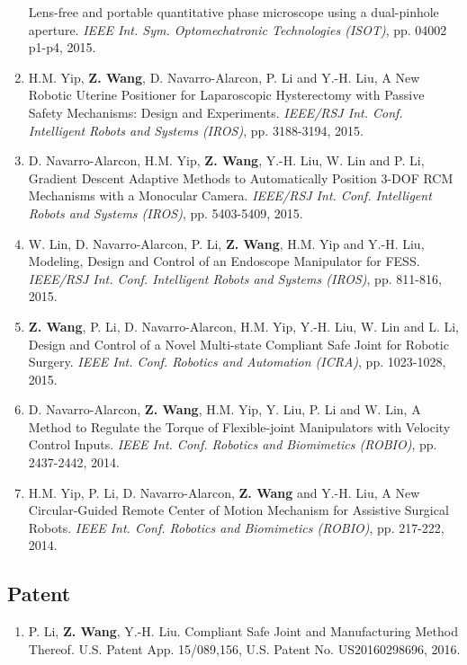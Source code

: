 \documentclass[10pt,letterpaper]{article}
\begin{document}
\begin{enumerate}
    Lens-free and portable quantitative phase microscope using a dual-pinhole aperture.
    \textit{{IEEE} Int. Sym. Optomechatronic Technologies (ISOT)}, pp. 04002 p1-p4, 2015.
    \item H.M. Yip, \textbf{Z. Wang}, D. Navarro-Alarcon, P. Li and Y.-H. Liu,
    A New Robotic Uterine Positioner for Laparoscopic Hysterectomy with Passive Safety Mechanisms: Design and Experiments.
    \textit{{IEEE/RSJ} Int. Conf. Intelligent Robots and Systems (IROS)}, pp. 3188-3194, 2015.
    \item D. Navarro-Alarcon, H.M. Yip, \textbf{Z. Wang}, Y.-H. Liu, W. Lin and P. Li,
    Gradient Descent Adaptive Methods to Automatically Position 3-DOF RCM Mechanisms with a Monocular Camera.
    \textit{{IEEE/RSJ} Int. Conf. Intelligent Robots and Systems (IROS)}, pp. 5403-5409, 2015.
    \item W. Lin, D. Navarro-Alarcon, P. Li, \textbf{Z. Wang}, H.M. Yip and Y.-H. Liu,
    Modeling, Design and Control of an Endoscope Manipulator for FESS.
    \textit{{IEEE/RSJ} Int. Conf. Intelligent Robots and Systems (IROS)}, pp. 811-816, 2015.
    \item \textbf{Z. Wang}, P. Li, D. Navarro-Alarcon, H.M. Yip, Y.-H. Liu, W. Lin and L. Li,
    Design and Control of a Novel Multi-state Compliant Safe Joint for Robotic Surgery.
    \textit{{IEEE} Int. Conf. Robotics and Automation (ICRA)}, pp. 1023-1028, 2015.
    \item D. Navarro-Alarcon, \textbf{Z. Wang}, H.M. Yip, Y. Liu, P. Li and W. Lin,
    A Method to Regulate the Torque of Flexible-joint Manipulators with Velocity Control Inputs.
    \textit{{IEEE} Int. Conf. Robotics and Biomimetics (ROBIO)}, pp. 2437-2442, 2014.
    \item H.M. Yip, P. Li, D. Navarro-Alarcon, \textbf{Z. Wang} and Y.-H. Liu,
    A New Circular-Guided Remote Center of Motion Mechanism for Assistive Surgical Robots.
    \textit{{IEEE} Int. Conf. Robotics and Biomimetics (ROBIO)}, pp. 217-222, 2014.
\end{enumerate}

\subsection*{Patent}
\begin{enumerate}
    \item P. Li, \textbf{Z. Wang}, Y.-H. Liu.
    Compliant Safe Joint and Manufacturing Method Thereof.
    U.S. Patent App. 15/089,156, U.S. Patent No. US20160298696, 2016.
\end{enumerate}


\end{document}
